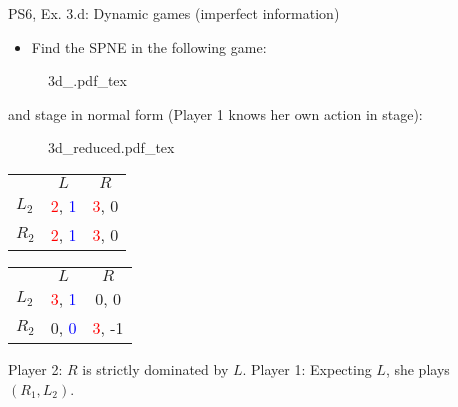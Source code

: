 \begin{frame}{PS6, Ex. 3.d: Dynamic games (imperfect information)}
    \begin{itemize}
      \item[(d)] Find the SPNE in the following game:
    \end{itemize}
    \vspace{-4pt}
    \begin{figure}[!h]
      \center
      \def\svgwidth{.8\columnwidth}
      {3d_.pdf_tex}
    \end{figure}
    \vspace{-4pt}
     and  stage in normal form (Player 1 knows her own action in  stage):
    \vspace{-4pt}
    \begin{figure}[!h]
      \center
      \def\svgwidth{.25\columnwidth}
      {3d_reduced.pdf_tex}
    \end{figure}
    \vspace{-9pt}
    \begin{table}
      \begin{tabular}{l|c|c|}
        \multicolumn{1}{c}{} & \multicolumn{1}{c}{\color{blue}$L$} & \multicolumn{1}{c}{$R$} \\\cline{2-3}
        $L_2$ & \textcolor{red}{2}, \textcolor{blue}{1} & \textcolor{red}{3}, 0 \\\cline{2-3}
        $R_2$ & \textcolor{red}{2}, \textcolor{blue}{1} & \textcolor{red}{3}, 0 \\\cline{2-3}
      \end{tabular}
      \enskip
      \begin{tabular}{l|c|c|}
        \multicolumn{1}{c}{} & \multicolumn{1}{c}{\color{blue}$L$} & \multicolumn{1}{c}{$R$} \\\cline{2-3}
        $L_2$ & \textcolor{red}{3}, \textcolor{blue}{1} & 0, 0 \\\cline{2-3}
        $R_2$ & 0, \textcolor{blue}{0} & \textcolor{red}{3}, -1 \\\cline{2-3}
      \end{tabular}
    \end{table}
    \vspace{-4pt}
    Player 2: $R$ is strictly dominated by $L$. Player 1: Expecting $L$, she plays $(R_1,L_2)$.
    \vfill\null
\end{frame}
